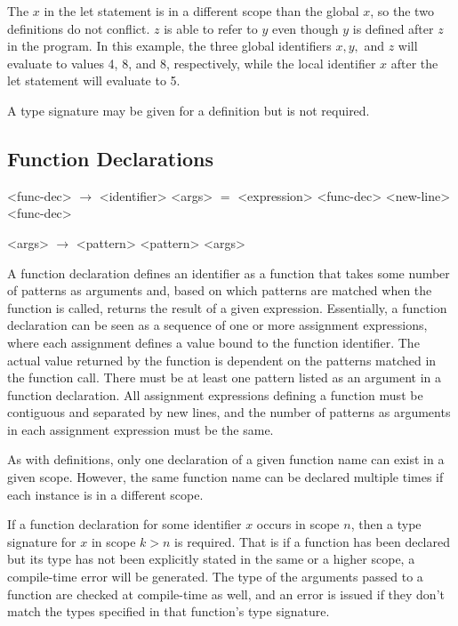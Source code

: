 The $x$ in the let statement is in a different scope than the global $x$, so
the two definitions do not conflict. $z$ is able to refer to $y$ even though
$y$ is defined after $z$ in the program. In this example, the three global 
identifiers $x, y, $ and $z$ will evaluate to values 4, 8, and 8, respectively,
while the local identifier $x$ after the let statement will evaluate to 5.

A type signature may be given for a definition but is not required.

\subsection{Function Declarations}

\begin{grammar}

<func-dec> $\rightarrow$ <identifier> <args> $=$ <expression> \alt
												 <func-dec> <new-line> <func-dec>

<args> $\rightarrow$ <pattern> \alt <pattern> <args>
\end{grammar}

A function declaration defines an identifier as a function that takes
some number of patterns as arguments and, based on which patterns are matched
when the function is called, returns the result
of a given expression. Essentially, a function declaration can be seen as a 
sequence of one or more assignment expressions, where each assignment defines
a value bound to the function identifier. The actual value returned by the function
is dependent on the patterns matched in the function call. There must be at least one pattern listed
as an argument in a function declaration. All assignment expressions defining
a function must be contiguous and separated by new lines, and the number of
patterns as arguments in each assignment expression must be the same.

As with definitions, only one declaration of a given function name can exist
in a given scope. However, the same function name can be declared multiple
times if each instance is in a different scope.

If a function declaration for some identifier $x$ occurs in scope $n$, then
a type signature for $x$ in scope $k>n$ is required. That is if a function has
been declared but its type has not been explicitly stated in the same or a higher
scope, a compile-time error will be generated. The type of the arguments
passed to a function are checked at compile-time as well, and an error
is issued if they don't match the types specified in that function's 
type signature.

